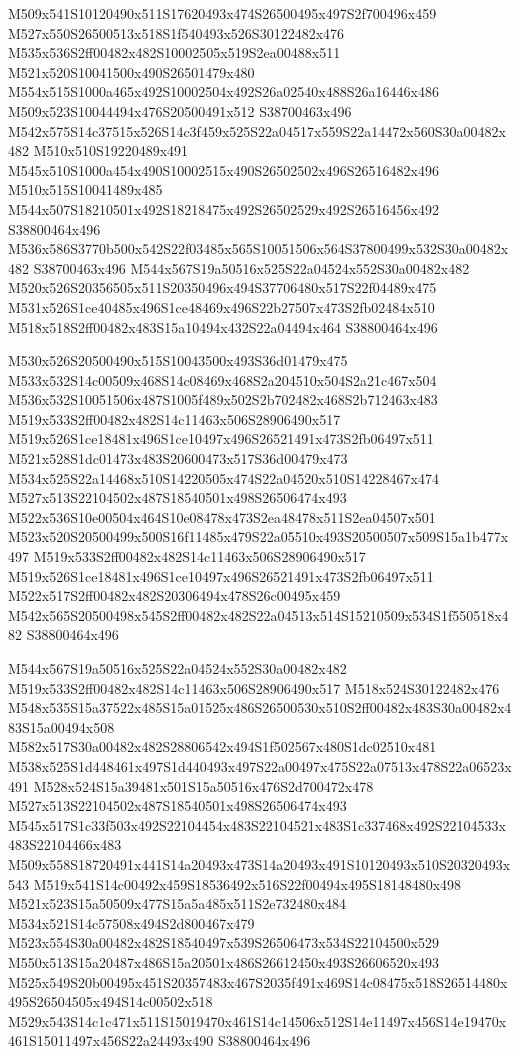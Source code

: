 \documentclass{article}
\begin{document}
\begin{multicols}{2}
M509x541S10120490x511S17620493x474S26500495x497S2f700496x459 M527x550S26500513x518S1f540493x526S30122482x476 M535x536S2ff00482x482S10002505x519S2ea00488x511 M521x520S10041500x490S26501479x480 M554x515S1000a465x492S10002504x492S26a02540x488S26a16446x486 M509x523S10044494x476S20500491x512 S38700463x496 M542x575S14c37515x526S14c3f459x525S22a04517x559S22a14472x560S30a00482x482 M510x510S19220489x491 M545x510S1000a454x490S10002515x490S26502502x496S26516482x496 M510x515S10041489x485 M544x507S18210501x492S18218475x492S26502529x492S26516456x492 S38800464x496 M536x586S3770b500x542S22f03485x565S10051506x564S37800499x532S30a00482x482 S38700463x496 M544x567S19a50516x525S22a04524x552S30a00482x482 M520x526S20356505x511S20350496x494S37706480x517S22f04489x475 M531x526S1ce40485x496S1ce48469x496S22b27507x473S2fb02484x510 M518x518S2ff00482x483S15a10494x432S22a04494x464 S38800464x496

M530x526S20500490x515S10043500x493S36d01479x475 M533x532S14c00509x468S14c08469x468S2a204510x504S2a21c467x504 M536x532S10051506x487S1005f489x502S2b702482x468S2b712463x483 M519x533S2ff00482x482S14c11463x506S28906490x517 M519x526S1ce18481x496S1ce10497x496S26521491x473S2fb06497x511 M521x528S1dc01473x483S20600473x517S36d00479x473 M534x525S22a14468x510S14220505x474S22a04520x510S14228467x474 M527x513S22104502x487S18540501x498S26506474x493 M522x536S10e00504x464S10e08478x473S2ea48478x511S2ea04507x501 M523x520S20500499x500S16f11485x479S22a05510x493S20500507x509S15a1b477x497 M519x533S2ff00482x482S14c11463x506S28906490x517 M519x526S1ce18481x496S1ce10497x496S26521491x473S2fb06497x511 M522x517S2ff00482x482S20306494x478S26c00495x459 M542x565S20500498x545S2ff00482x482S22a04513x514S15210509x534S1f550518x482 S38800464x496

M544x567S19a50516x525S22a04524x552S30a00482x482 M519x533S2ff00482x482S14c11463x506S28906490x517 M518x524S30122482x476 M548x535S15a37522x485S15a01525x486S26500530x510S2ff00482x483S30a00482x483S15a00494x508 M582x517S30a00482x482S28806542x494S1f502567x480S1dc02510x481 M538x525S1d448461x497S1d440493x497S22a00497x475S22a07513x478S22a06523x491 M528x524S15a39481x501S15a50516x476S2d700472x478 M527x513S22104502x487S18540501x498S26506474x493 M545x517S1c33f503x492S22104454x483S22104521x483S1c337468x492S22104533x483S22104466x483 M509x558S18720491x441S14a20493x473S14a20493x491S10120493x510S20320493x543 M519x541S14c00492x459S18536492x516S22f00494x495S18148480x498 M521x523S15a50509x477S15a5a485x511S2e732480x484 M534x521S14c57508x494S2d800467x479 M523x554S30a00482x482S18540497x539S26506473x534S22104500x529 M550x513S15a20487x486S15a20501x486S26612450x493S26606520x493 M525x549S20b00495x451S20357483x467S2035f491x469S14c08475x518S26514480x495S26504505x494S14c00502x518 M529x543S14c1c471x511S15019470x461S14c14506x512S14e11497x456S14e19470x461S15011497x456S22a24493x490 S38800464x496


\end{multicols}
\end{document}
